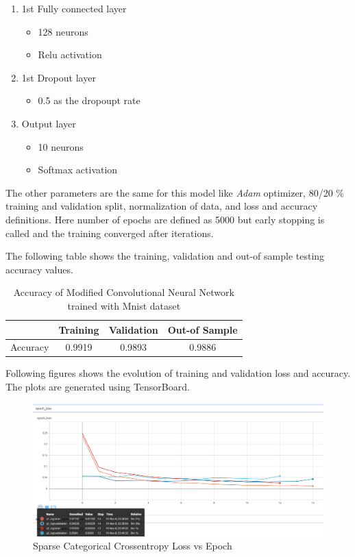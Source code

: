 \documentclass[11pt]{article}
\begin{document}
\begin{enumerate}
    \item 1st Fully connected layer
    \begin{itemize}
        \item 128 neurons
        \item Relu activation
    \end{itemize}
    \item 1st Dropout layer
    \begin{itemize}
        \item 0.5 as the dropoupt rate
    \end{itemize}
    \item Output layer
    \begin{itemize}
        \item 10 neurons
        \item Softmax activation
    \end{itemize}
\end{enumerate}

The other parameters are the same for this model like \emph{Adam} optimizer, 80/20 $\%$ training and validation split, normalization of data, and loss and accuracy definitions. Here number of epochs are defined as 5000 but early stopping is called and the training converged after  iterations. 

The following table shows the training, validation and out-of sample testing accuracy values.\medskip

\bgroup
\def\arraystretch{1.5}%
\begin{table}[H]
\centering
\caption{Accuracy of Modified Convolutional Neural Network trained with Mnist dataset}
\begin{tabular}{|c|c|c|c|}
\hline
            &  Training     &  Validation & Out-of Sample   \\ \hline
Accuracy    &  0.9919       & 0.9893      &  0.9886         \\ \hline
\end{tabular}
\label{table:q1acc}
\end{table}
\egroup

Following figures shows the evolution of training and validation loss and accuracy. The plots are generated using TensorBoard.

\begin{figure}[H]
\centering
\includegraphics[width=0.95\columnwidth]{pics/epoch_loss.png}
\captionsetup{justification=centering}
\caption{Sparse Categorical Crossentropy Loss vs Epoch}
\label{fig:data}
\end{figure}
\end{document}
